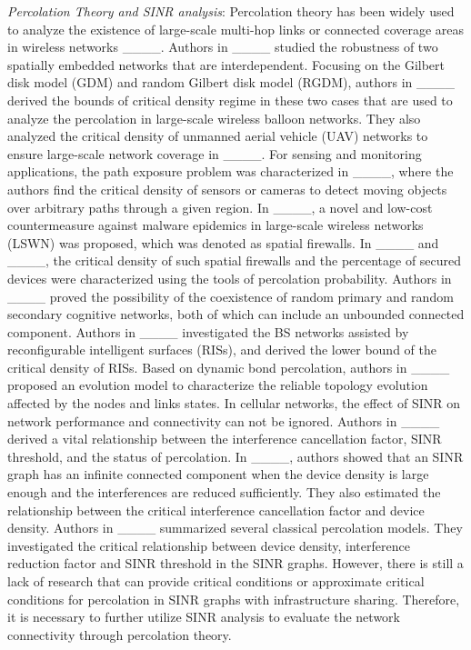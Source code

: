 \indent \textit{Percolation Theory and SINR analysis}: Percolation theory has been widely used to analyze the existence of large-scale multi-hop links or connected coverage areas in wireless networks ____. Authors in ____ studied the robustness of two spatially embedded networks that are interdependent. Focusing on the Gilbert disk model (GDM) and random Gilbert disk model (RGDM), authors in ____ derived the bounds of critical density regime in these two cases that are used to analyze the percolation in large-scale wireless balloon networks. They also analyzed the critical density of unmanned aerial vehicle (UAV) networks to ensure large-scale network coverage in ____. For sensing and monitoring applications, the path exposure problem was characterized in ____, where the authors find the critical density of sensors or cameras to detect moving objects over arbitrary paths through a given region. In ____, a novel and low-cost countermeasure against malware epidemics in large-scale wireless networks (LSWN) was proposed, which was denoted as spatial firewalls. In ____ and ____, the critical density of such spatial firewalls and the percentage of secured devices were characterized using the tools of percolation probability. Authors in ____ proved the possibility of the coexistence of random primary and random secondary cognitive networks, both of which can include an unbounded connected component. Authors in ____ investigated the BS networks assisted by reconfigurable intelligent surfaces (RISs), and derived the lower bound of the critical density of RISs. Based on dynamic bond percolation, authors in ____ proposed an evolution model to characterize the reliable topology evolution affected by the nodes and links states. In cellular networks, the effect of SINR on network performance and connectivity can not be ignored. Authors in ____ derived a vital relationship between the interference cancellation factor, SINR threshold, and the status of percolation. In ____, authors showed that an SINR graph has an infinite connected component when the device density is large enough and the interferences are reduced sufficiently. They also estimated the relationship between the critical interference cancellation factor and device density. Authors in ____ summarized several classical percolation models. They investigated the critical relationship between device density, interference reduction factor and SINR threshold in the SINR graphs. However, there is still a lack of research that can provide critical conditions or approximate critical conditions for percolation in SINR graphs with infrastructure sharing. Therefore, it is necessary to further utilize SINR analysis to evaluate the network connectivity through percolation theory.